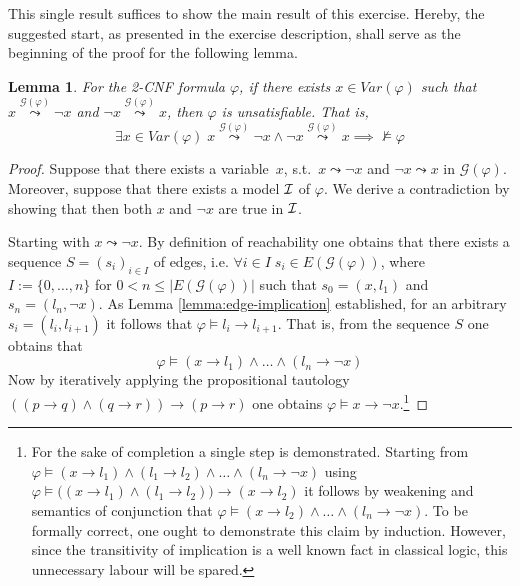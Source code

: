 \documentclass [11pt]{article}
\renewcommand{\phi}{\varphi}
\newcommand{\lto}{\rightarrow}
\newcommand{\nmodels}{\not\models}
\newcommand{\var}{\mathit{Var}}
\newtheorem{lemma}[theorem]{Lemma}
\newcommand{\reach}{\leadsto}
\newcommand{\sreach}[1]{\stackrel{#1}{\leadsto}}
\begin{document}
This single result suffices to show the main result of this exercise. Hereby, the suggested start, as presented in the exercise description, shall serve as the beginning of the proof for the following lemma.


\begin{lemma}
For the 2-CNF formula $\varphi$, if there exists $x \in \var(\varphi)$ such that $x \sreach{\mathcal{G}(\varphi)} \neg x$ and $\neg x \sreach{\mathcal{G}(\varphi)} x$,  then $\varphi$ is unsatisfiable. That is,
\begin{equation*}
 \exists x \in \var(\varphi)\;  x \sreach{\mathcal{G}(\varphi)} \neg x \land \neg x \sreach{\mathcal{G}(\varphi)} x \implies \nmodels \varphi 
\end{equation*}
\end{lemma} 
\begin{proof}
Suppose that there exists a variable~$x$, s.t.\
$x \reach  \neg x$ and $\neg x \reach x$ in
$\mathcal{G}(\phi)$. Moreover, suppose that there exists a model ${\cal I}$ of $\phi$. We derive a contradiction by showing that 
then both $x$ and $\neg x$ are true in ${\cal I}$. 

Starting with $x \reach  \neg x$. By definition of reachability one obtains that there exists a sequence $S=(s_i)_{i\in I}$ of edges, i.e. $\forall i \in I \; s_i\in E(\mathcal{G}(\varphi))$, where 
$I :=\{0 , \dots,n\}$ for $0 < n \leq  |E(\mathcal{G}(\varphi))| $ such that $s_0=(x,l_1)$ and $s_n=(l_n,\neg x)$.
As Lemma \ref{lemma:edge-implication} established, for an arbitrary $s_i=(l_i,l_{i+1})$ it follows that $\varphi \models l_i \lto l_{i+1}$.
That is, from the sequence $S$ one obtains that 
\begin{equation*}
\varphi \models (x\lto l_{1}) \land \dots \land  (l_n \lto \neg x)
\end{equation*}
Now by iteratively applying the propositional tautology $((p \to q) \land (q \to r)) \to (p \to r)$ one obtains $\varphi \models x \lto \neg x$.\footnote{
For the sake of completion a single step is demonstrated. Starting from 
$\varphi \models (x\lto l_{1}) \land  (l_{1} \lto l_2) \land \dots \land  (l_n \lto \neg x)$ using $\varphi \models \big((x\lto l_{1}) \land  (l_{1} \lto l_2)\big) \to  (x\lto l_2)$
it follows by weakening and semantics of conjunction that  $\varphi \models   (x \lto l_2) \land \dots \land  (l_n \lto \neg x)$.
To be formally correct, one ought to demonstrate this claim by induction. However, since the transitivity of implication is a well known fact in classical logic, this unnecessary labour will be spared. 
%
%
} 


\end{proof}
\end{document}
